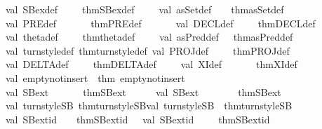 \begin{isabellebody}
val\ SBex{}{\isacharunderscore}def\ \ \ \ {\isacharequal}\ thm{\isachardoublequote}SBex{}{\isacharunderscore}def{\isachardoublequote}\ \ \ \ \ val\ asSet{\isacharunderscore}def\ \ \ {\isacharequal}\ thm{\isachardoublequote}asSet{\isacharunderscore}def{\isachardoublequote}\isanewline
val\ PRE{\isacharunderscore}def\ \ \ \ \ \ {\isacharequal}\ thm{\isachardoublequote}PRE{\isacharunderscore}def{\isachardoublequote}\ \ \ \ \ \ \ val\ DECL{\isacharunderscore}def\ \ \ \ {\isacharequal}\ thm{\isachardoublequote}DECL{\isacharunderscore}def{\isachardoublequote}\isanewline
val\ theta{\isacharunderscore}def\ \ \ \ {\isacharequal}\ thm{\isachardoublequote}theta{\isacharunderscore}def{\isachardoublequote}\ \ \ \ \ val\ asPred{\isacharunderscore}def\ \ {\isacharequal}\ thm{\isachardoublequote}asPred{\isacharunderscore}def{\isachardoublequote}\isanewline
val\ turnstyle{\isacharunderscore}def{\isacharequal}\ thm{\isachardoublequote}turnstyle{\isacharunderscore}def{\isachardoublequote}\ val\ PROJ{\isacharunderscore}def\ \ \ \ {\isacharequal}\ thm{\isachardoublequote}PROJ{\isacharunderscore}def{\isachardoublequote}\isanewline
val\ DELTA{\isacharunderscore}def\ \ \ \ {\isacharequal}\ thm{\isachardoublequote}DELTA{\isacharunderscore}def{\isachardoublequote}\ \ \ \ \ val\ XI{\isacharunderscore}def\ \ \ \ \ \ {\isacharequal}\ thm{\isachardoublequote}XI{\isacharunderscore}def{\isachardoublequote}\isanewline
\isanewline
val\ empty{\isacharunderscore}not{\isacharunderscore}insert\ {\isacharequal}\ thm\ {\isachardoublequote}empty{\isacharunderscore}not{\isacharunderscore}insert{\isachardoublequote}{\isacharsemicolon}\isanewline
\isanewline
val\ SB{}{\isacharunderscore}ext\ \ \ \ \ \ {\isacharequal}\ thm{\isachardoublequote}SB{}{\isacharunderscore}ext{\isachardoublequote}\ \ \ \ \ \ val\ SB{\isacharunderscore}ext\ \ \ \ \ \ \ {\isacharequal}\ thm{\isachardoublequote}SB{\isacharunderscore}ext{\isachardoublequote}\isanewline
val\ turnstyle{\isacharunderscore}SB{}{\isacharequal}\ thm{\isachardoublequote}turnstyle{\isacharunderscore}SB{}{\isachardoublequote}val\ turnstyle{\isacharunderscore}SB\ {\isacharequal}\ thm{\isachardoublequote}turnstyle{\isacharunderscore}SB{\isachardoublequote}\isanewline
val\ SB{}{\isacharunderscore}ext{\isacharunderscore}id\ \ \ {\isacharequal}\ thm{\isachardoublequote}SB{}{\isacharunderscore}ext{\isacharunderscore}id{\isachardoublequote}\ \ \ val\ SB{\isacharunderscore}ext{\isacharunderscore}id\ \ \ \ {\isacharequal}\ thm{\isachardoublequote}SB{\isacharunderscore}ext{\isacharunderscore}id{\isachardoublequote}\isanewline

\end{isabellebody}
